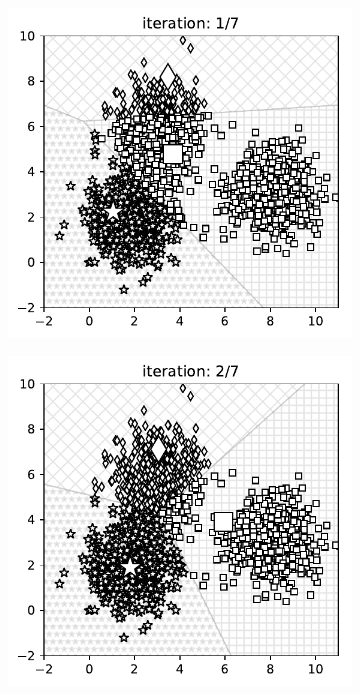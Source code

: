 \begin{figure}[t]
\begin{subfigure}{0.325\textwidth}
\includegraphics[width=0.99\linewidth]{ebookML_src/src/kmeans/ex_0.pdf}
\end{subfigure}
\begin{subfigure}{0.325\textwidth}
\includegraphics[width=0.99\linewidth]{ebookML_src/src/kmeans/ex_1.pdf}

\end{subfigure}
\end{figure}
